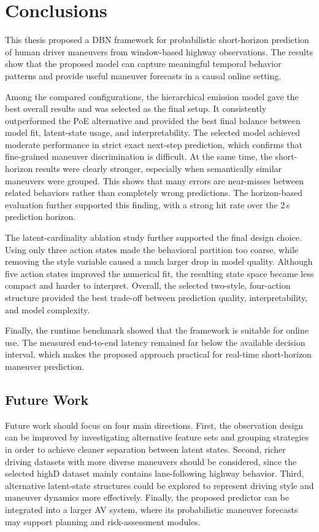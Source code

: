 \chapter{Conclusions}
 
This thesis proposed a \ac{DBN} framework for probabilistic short-horizon prediction of human driver maneuvers from window-based highway observations. 
The results show that the proposed model can capture meaningful temporal behavior patterns and provide useful maneuver forecasts in a causal online setting.

\par Among the compared configurations, the hierarchical emission model gave the best overall results and was selected as the final setup. 
It consistently outperformed the \ac{PoE} alternative and provided the best final balance between model fit, latent-state usage, and interpretability. 
The selected model achieved moderate performance in strict exact next-step prediction, which confirms that fine-grained maneuver discrimination is difficult. 
At the same time, the short-horizon results were clearly stronger, especially when semantically similar maneuvers were grouped. 
This shows that many errors are near-misses between related behaviors rather than completely wrong predictions. 
The horizon-based evaluation further supported this finding, with a strong hit rate over the 2\,s prediction horizon.

\par The latent-cardinality ablation study further supported the final design choice. 
Using only three action states made the behavioral partition too coarse, while removing the style variable caused a much larger drop in model quality. 
Although five action states improved the numerical fit, the resulting state space became less compact and harder to interpret. 
Overall, the selected two-style, four-action structure provided the best trade-off between prediction quality, interpretability, and model complexity.

\par Finally, the runtime benchmark showed that the framework is suitable for online use. 
The measured end-to-end latency remained far below the available decision interval, which makes the proposed approach practical for real-time short-horizon maneuver prediction.

\section{Future Work}

Future work should focus on four main directions.  
First, the observation design can be improved by investigating alternative feature sets and grouping strategies in order to achieve cleaner separation between latent states. 
Second, richer driving datasets with more diverse maneuvers should be considered, since the selected highD dataset mainly contains lane-following highway behavior. 
Third, alternative latent-state structures could be explored to represent driving style and maneuver dynamics more effectively. 
Finally, the proposed predictor can be integrated into a larger \ac{AV} system, where its probabilistic maneuver forecasts may support planning and risk-assessment modules.